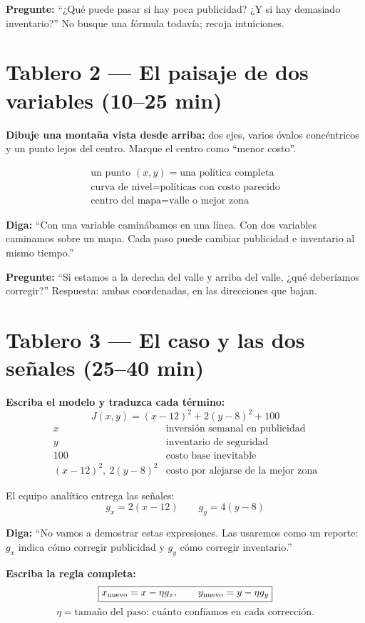 \documentclass[11pt]{article}
\begin{document}
\textbf{Pregunte:} ``¿Qué puede pasar si hay poca publicidad? ¿Y si hay demasiado
inventario?'' No busque una fórmula todavía; recoja intuiciones.

\section*{Tablero 2 --- El paisaje de dos variables (10--25 min)}
\textbf{Dibuje una montaña vista desde arriba:} dos ejes, varios óvalos concéntricos
y un punto lejos del centro. Marque el centro como ``menor costo''.

\[
\begin{array}{c}
\text{un punto }(x,y)=\text{una política completa}\\
\text{curva de nivel}=\text{políticas con costo parecido}\\
\text{centro del mapa}=\text{valle o mejor zona}
\end{array}
\]

\textbf{Diga:} ``Con una variable caminábamos en una línea. Con dos variables
caminamos sobre un mapa. Cada paso puede cambiar publicidad e inventario al mismo
tiempo.''

\textbf{Pregunte:} ``Si estamos a la derecha del valle y arriba del valle, ¿qué
deberíamos corregir?'' Respuesta: ambas coordenadas, en las direcciones que bajan.

\newpage
\section*{Tablero 3 --- El caso y las dos señales (25--40 min)}
\textbf{Escriba el modelo y traduzca cada término:}
\[
\boxed{J(x,y)=(x-12)^2+2(y-8)^2+100}
\]
\[
\begin{array}{c|c}
x&\text{inversión semanal en publicidad}\\
y&\text{inventario de seguridad}\\
100&\text{costo base inevitable}\\
(x-12)^2,\ 2(y-8)^2&\text{costo por alejarse de la mejor zona}
\end{array}
\]

El equipo analítico entrega las señales:
\[
\boxed{g_x=2(x-12)}\qquad\boxed{g_y=4(y-8)}
\]

\textbf{Diga:} ``No vamos a demostrar estas expresiones. Las usaremos como un
reporte: $g_x$ indica cómo corregir publicidad y $g_y$ cómo corregir inventario.''

\textbf{Escriba la regla completa:}
\[
\boxed{x_{\rm nuevo}=x-\eta g_x,\qquad
y_{\rm nuevo}=y-\eta g_y}
\]
\[
\eta=\text{tamaño del paso: cuánto confiamos en cada corrección}.
\]
\end{document}
